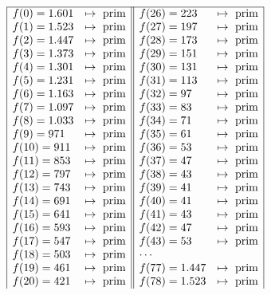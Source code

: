 \begin{refsegment}
$$
\begin{array}{| ll       || ll |}
\hline
f(0)  = 1.601 & \mapsto {\rm ~prim}   &   f(26) =   223 & \mapsto {\rm ~prim} \\
f(1)  = 1.523 & \mapsto {\rm ~prim}   &   f(27) =   197 & \mapsto {\rm ~prim} \\
f(2)  = 1.447 & \mapsto {\rm ~prim}   &   f(28) =   173 & \mapsto {\rm ~prim} \\
f(3)  = 1.373 & \mapsto {\rm ~prim}   &   f(29) =   151 & \mapsto {\rm ~prim} \\
f(4)  = 1.301 & \mapsto {\rm ~prim}   &   f(30) =   131 & \mapsto {\rm ~prim} \\
f(5)  = 1.231 & \mapsto {\rm ~prim}   &   f(31) =   113 & \mapsto {\rm ~prim} \\
f(6)  = 1.163 & \mapsto {\rm ~prim}   &   f(32) =    97 & \mapsto {\rm ~prim} \\
f(7)  = 1.097 & \mapsto {\rm ~prim}   &   f(33) =    83 & \mapsto {\rm ~prim} \\
f(8)  = 1.033 & \mapsto {\rm ~prim}   &   f(34) =    71 & \mapsto {\rm ~prim} \\
f(9)  =   971 & \mapsto {\rm ~prim}   &   f(35) =    61 & \mapsto {\rm ~prim} \\
f(10) =   911 & \mapsto {\rm ~prim}   &   f(36) =    53 & \mapsto {\rm ~prim} \\
f(11) =   853 & \mapsto {\rm ~prim}   &   f(37) =    47 & \mapsto {\rm ~prim} \\
f(12) =   797 & \mapsto {\rm ~prim}   &   f(38) =    43 & \mapsto {\rm ~prim} \\
f(13) =   743 & \mapsto {\rm ~prim}   &   f(39) =    41 & \mapsto {\rm ~prim} \\
f(14) =   691 & \mapsto {\rm ~prim}   &   f(40) =    41 & \mapsto {\rm ~prim} \\
f(15) =   641 & \mapsto {\rm ~prim}   &   f(41) =    43 & \mapsto {\rm ~prim} \\
f(16) =   593 & \mapsto {\rm ~prim}   &   f(42) =    47 & \mapsto {\rm ~prim} \\
f(17) =   547 & \mapsto {\rm ~prim}   &   f(43) =    53 & \mapsto {\rm ~prim} \\
f(18) =   503 & \mapsto {\rm ~prim}   &   \cdots  &  \\
f(19) =   461 & \mapsto {\rm ~prim}   &   f(77) = 1.447 & \mapsto {\rm ~prim} \\
f(20) =   421 & \mapsto {\rm ~prim}   &   f(78) = 1.523 & \mapsto {\rm ~prim} \\

\end{array}$$
\end{refsegment}
